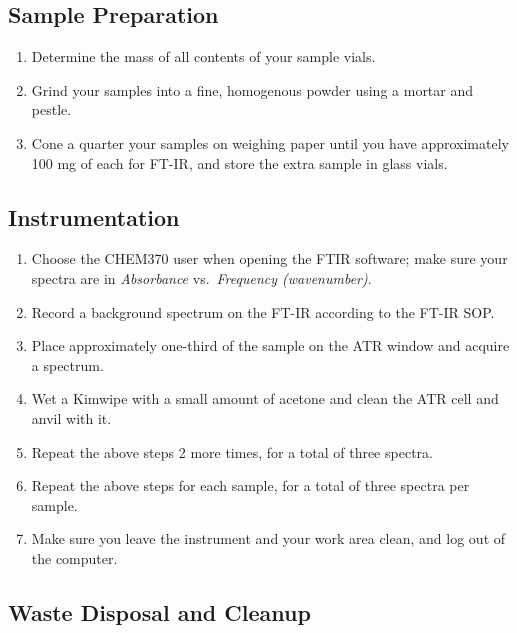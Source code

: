 \documentclass[]{tufte-book}
\providecommand{\tightlist}{%
  \setlength{\itemsep}{0pt}\setlength{\parskip}{0pt}}
\begin{document}
\hypertarget{sample-preparation-3}{%
\subsection{Sample Preparation}\label{sample-preparation-3}}

\begin{enumerate}
\def\labelenumi{\arabic{enumi}.}
\tightlist
\item
  Determine the mass of all contents of your sample vials.
\item
  Grind your samples into a fine, homogenous powder using a mortar and pestle.
\item
  Cone a quarter your samples on weighing paper until you have approximately 100 mg of each for FT-IR, and store the extra sample in glass vials.
\end{enumerate}

\hypertarget{instrumentation-2}{%
\subsection{Instrumentation}\label{instrumentation-2}}

\begin{enumerate}
\def\labelenumi{\arabic{enumi}.}
\tightlist
\item
  Choose the CHEM370 user when opening the FTIR software; make sure your spectra are in \emph{Absorbance} vs.~\emph{Frequency (wavenumber)}.
\item
  Record a background spectrum on the FT-IR according to the FT-IR SOP.
\item
  Place approximately one-third of the sample on the ATR window and acquire a spectrum.
\item
  Wet a Kimwipe with a small amount of acetone and clean the ATR cell and anvil with it.
\item
  Repeat the above steps 2 more times, for a total of three spectra.
\item
  Repeat the above steps for each sample, for a total of three spectra per sample.
\item
  Make sure you leave the instrument and your work area clean, and log out of the computer.
\end{enumerate}

\hypertarget{waste-disposal-and-cleanup-5}{%
\subsection{Waste Disposal and Cleanup}\label{waste-disposal-and-cleanup-5}}
\end{document}
